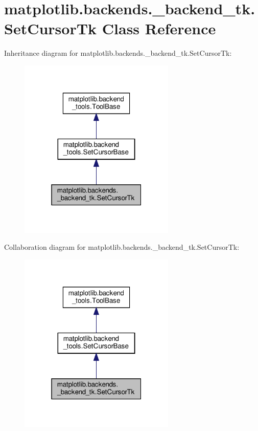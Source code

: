 \hypertarget{classmatplotlib_1_1backends_1_1__backend__tk_1_1SetCursorTk}{}\section{matplotlib.\+backends.\+\_\+backend\+\_\+tk.\+Set\+Cursor\+Tk Class Reference}
\label{classmatplotlib_1_1backends_1_1__backend__tk_1_1SetCursorTk}


Inheritance diagram for matplotlib.\+backends.\+\_\+backend\+\_\+tk.\+Set\+Cursor\+Tk\+:
\nopagebreak
\begin{figure}[H]
\begin{center}
\leavevmode
\includegraphics[width=211pt]{classmatplotlib_1_1backends_1_1__backend__tk_1_1SetCursorTk__inherit__graph}
\end{center}
\end{figure}


Collaboration diagram for matplotlib.\+backends.\+\_\+backend\+\_\+tk.\+Set\+Cursor\+Tk\+:
\nopagebreak
\begin{figure}[H]
\begin{center}
\leavevmode
\includegraphics[width=211pt]{classmatplotlib_1_1backends_1_1__backend__tk_1_1SetCursorTk__coll__graph}
\end{center}
\end{figure}

